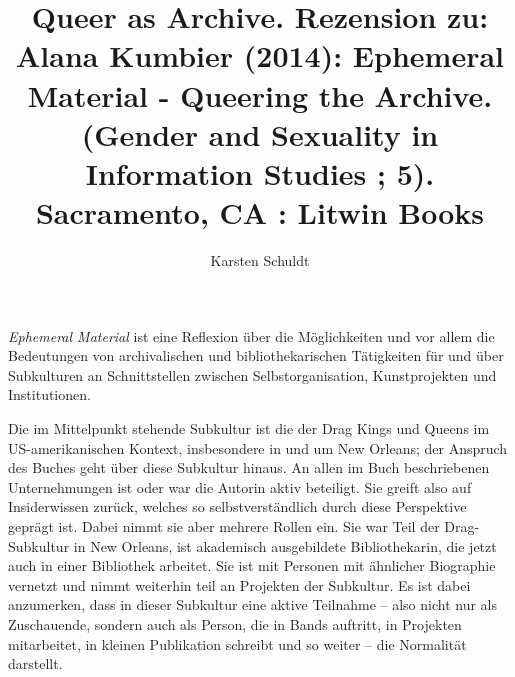 \documentclass[a4paper,
fontsize=11pt,
oneside,
numbers=noperiodatend,
parskip=half-,
bibliography=totoc,
final
]{scrartcl}
\title{\LARGE{Queer as Archive. Rezension zu: Alana Kumbier (2014): Ephemeral Material - Queering the Archive. (Gender and Sexuality in Information Studies ; 5). Sacramento, CA : Litwin Books}} %
\author{Karsten Schuldt} %
\date{}
\begin{document}
\maketitle
\thispagestyle{fancyplain} 


\emph{Ephemeral Material} ist eine Reflexion über die Möglichkeiten und
vor allem die Bedeutungen von archivalischen und bibliothekarischen
Tätigkeiten für und über Subkulturen an Schnittstellen zwischen
Selbstorganisation, Kunstprojekten und Institutionen.

Die im Mittelpunkt stehende Subkultur ist die der Drag Kings und Queens
im US-amerikanischen Kontext, insbesondere in und um New Orleans; der
Anspruch des Buches geht über diese Subkultur hinaus. An allen im Buch
beschriebenen Unternehmungen ist oder war die Autorin aktiv beteiligt.
Sie greift also auf Insiderwissen zurück, welches so selbstverständlich
durch diese Perspektive geprägt ist. Dabei nimmt sie aber mehrere Rollen
ein. Sie war Teil der Drag-Subkultur in New Orleans, ist akademisch
ausgebildete Bibliothekarin, die jetzt auch in einer Bibliothek
arbeitet. Sie ist mit Personen mit ähnlicher Biographie vernetzt und
nimmt weiterhin teil an Projekten der Subkultur. Es ist dabei
anzumerken, dass in dieser Subkultur eine aktive Teilnahme -- also nicht
nur als Zuschauende, sondern auch als Person, die in Bands auftritt, in
Projekten mitarbeitet, in kleinen Publikation schreibt und so weiter --
die Normalität darstellt.
\end{document}
